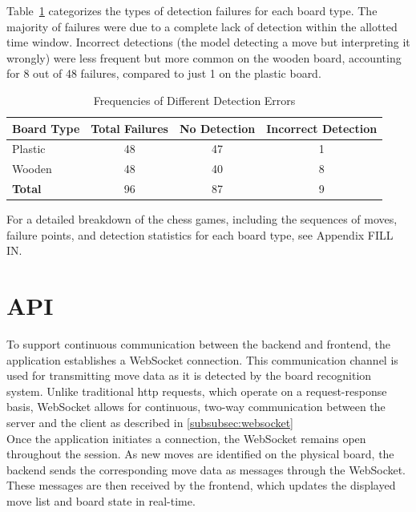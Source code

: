 Table~\ref{tab:different-errors} categorizes the types of detection failures for each board type. The majority of failures were due to a complete lack of detection within the allotted time window. Incorrect detections (the model detecting a move but interpreting it wrongly) were less frequent but more common on the wooden board, accounting for 8 out of 48 failures, compared to just 1 on the plastic board.  \\

\begin{table}[htbp]
\centering
\caption{Frequencies of Different Detection Errors}
\label{tab:different-errors}
\begin{tabular}{lccc}
\toprule
\textbf{Board Type} & \textbf{Total Failures} & \textbf{No Detection} & \textbf{Incorrect Detection} \\
\midrule
Plastic & 48 & 47 & 1 \\
Wooden & 48 & 40 & 8 \\
\midrule
\textbf{Total} & 96 & 87 & 9 \\
\bottomrule
\end{tabular}
\end{table}

For a detailed breakdown of the chess games, including the sequences of moves, failure points, and detection statistics for each board type, see Appendix FILL IN.


\section{API}
To support continuous communication between the backend and frontend, the application establishes a WebSocket connection. This communication channel is used for transmitting move data as it is detected by the board recognition system. Unlike traditional \gls{http} requests, which operate on a request-response basis, WebSocket allows for continuous, two-way communication between the server and the client as described in \ref{subsubsec:websocket} \\

Once the application initiates a connection, the WebSocket remains open throughout the session. As new moves are identified on the physical board, the backend sends the corresponding move data as messages through the WebSocket. These messages are then received by the frontend, which updates the displayed move list and board state in real-time. \\

